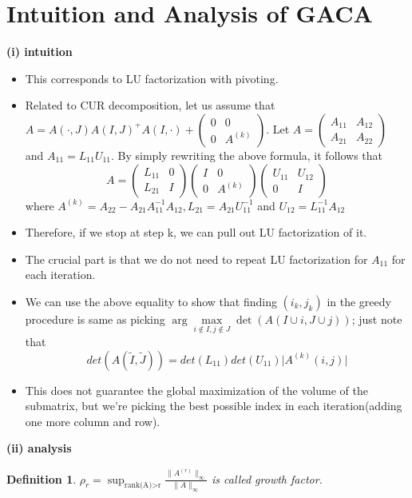 \documentclass[11pt,reqno]{amsart}
\newtheorem{definition}{Definition}
\theoremstyle{remark}
\begin{document}
\begin{sloppypar}
\section{Intuition and Analysis of GACA}
\textbf{(i) intuition}
\begin{itemize}
\item This corresponds to LU factorization with pivoting.
\item Related to CUR decomposition, let us assume that $A=A(\cdot, J)A(I,J)^{+}A(I,\cdot)+
\begin{pmatrix}
0 & 0\\
0 & A^{(k)}
\end{pmatrix}$.
Let  
$A=\begin{pmatrix}
A_{11} & A_{12}\\
A_{21} & A_{22}
\end{pmatrix}$ and $A_{11}=L_{11}U_{11}$. By simply 
rewriting the above formula, it follows that 
\[A=
\begin{pmatrix}
L_{11} & 0\\
L_{21} & I
\end{pmatrix}
\begin{pmatrix}
I & 0\\
0 & A^{(k)}
\end{pmatrix}
\begin{pmatrix}
U_{11} & U_{12}\\
0 & I
\end{pmatrix}
\]
where $A^{(k)}=A_{22}-A_{21}A_{11}^{-1}A_{12}, L_{21}=A_{21}U_{11}^{-1}$ and $U_{12}=L_{11}^{-1}A_{12}$
\item Therefore, if we stop at step k, we can pull out LU factorization of it. 
\item The crucial part is that we do not need to repeat LU factorization for $A_{11}$ for each iteration.
\item We can use the above equality to show that finding $(i_k,j_k)$ in the greedy procedure
 is same as picking $\arg\max\limits_{i\not\in I,j\not\in J}\det(A(I\cup i, J\cup j))$; just note that 
\[
det(A(\tilde I, \tilde J))=det(L_{11})det(U_{11})\lvert A^{(k)}(i,j)\rvert
\]
\item This does not guarantee the global maximization of the volume of the submatrix, but we're picking the best possible index
 in each iteration(adding one more column and row).
\end{itemize}
\textbf{(ii) analysis}
\begin{definition}
$\rho_r = \sup_{\text{rank(A)$>$r}}\frac
{\lVert A^{(r)}\rVert_\infty}{\lVert A\rVert_\infty}$ is called growth factor.

\end{definition}
\end{sloppypar}
\end{document}
